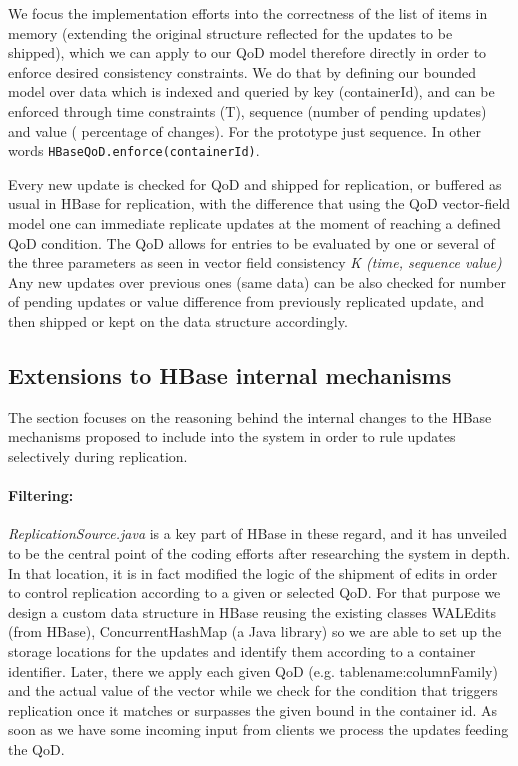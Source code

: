 We focus the implementation efforts into the correctness of the list of items in memory (extending the original structure reflected for the updates to be shipped), which we can apply to our QoD model therefore directly in order to enforce desired consistency constraints. We do that by defining our bounded model over data which is indexed and queried by key (containerId), and can be enforced through time constraints (T), sequence (number of pending updates) and value ( percentage of changes). For the prototype just sequence. In other words \texttt{HBaseQoD.enforce(containerId)}.

Every new update is checked for QoD and shipped for replication, or buffered as usual in HBase for replication, with the difference that using the QoD vector-field model one can immediate replicate updates at the moment of reaching a defined QoD condition. The QoD allows for entries to be evaluated by one or several of the three parameters as seen in vector field consistency \emph{K (time, sequence value)}~\cite{Santos:2007} Any new updates over previous ones (same data) can be also checked for number of pending updates or value difference from previously replicated update, and then shipped or kept on the data structure accordingly.



\subsection{Extensions to HBase internal mechanisms}\label{extensions}
The section focuses on the reasoning behind the internal changes to the HBase mechanisms proposed to include into the system in order to rule updates selectively during replication.


\paragraph*{Filtering:}
\emph{ReplicationSource.java} is a key part of HBase in these regard, and it has unveiled to be the central point of the coding efforts after researching the system in depth. In that location, it is in fact modified the logic of the shipment of edits in order to control replication according to a given or selected QoD. For that purpose we design a custom data structure in HBase reusing the existing classes WALEdits (from HBase), ConcurrentHashMap (a Java library) so we are able to set up the storage locations for the updates and identify them according to a container identifier. Later, there we apply each given QoD (e.g. tablename:columnFamily) and the actual value of the vector while we check for the condition that triggers replication once it matches or surpasses the given bound in the container id. As soon as we have some incoming input from clients we process the updates feeding the QoD.

